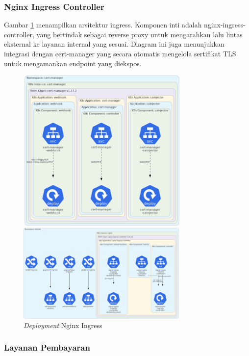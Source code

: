\pagebreak

\subsubsection{Nginx Ingress Controller}

Gambar \ref{fig:deployment-nginx} menampilkan arsitektur ingress. Komponen inti adalah nginx-ingress-controller, yang bertindak sebagai reverse proxy untuk mengarahkan lalu lintas eksternal ke layanan internal yang sesuai. Diagram ini juga menunjukkan integrasi dengan cert-manager yang secara otomatis mengelola sertifikat TLS untuk mengamankan endpoint yang diekspos.

\begin{figure}[H]
    \centering
    \includegraphics[width=0.75\textwidth]{resources/chapter-4/nginx-1.png}
    \caption{\textit{Deployment} Nginx Ingress}
    \label{fig:deployment-nginx}
\end{figure}

\pagebreak

\subsubsection{Layanan Pembayaran}

